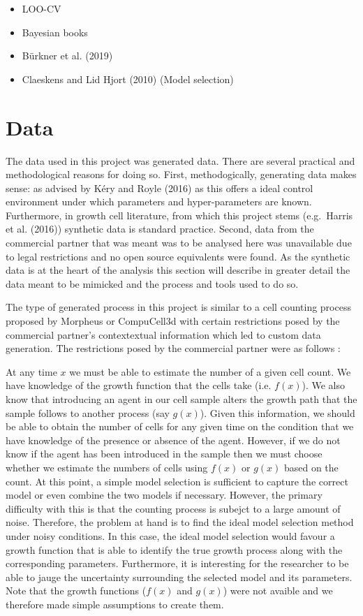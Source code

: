 \documentclass[]{article}
\providecommand{\tightlist}{%
  \setlength{\itemsep}{0pt}\setlength{\parskip}{0pt}}
\begin{document}
\begin{itemize}
\tightlist
\item
  LOO-CV
\item
  Bayesian books
\item
  Bürkner et al. (2019)
\item
  Claeskens and Lid Hjort (2010) (Model selection)
\end{itemize}

\hypertarget{data}{%
\section{Data}\label{data}}

The data used in this project was generated data. There are several
practical and methodological reasons for doing so. First,
methodogically, generating data makes sense: as advised by Kéry and
Royle (2016) as this offers a ideal control environment under which
parameters and hyper-parameters are known. Furthermore, in growth cell
literature, from which this project stems (e.g.~Harris et al. (2016))
synthetic data is standard practice. Second, data from the commercial
partner that was meant was to be analysed here was unavailable due to
legal restrictions and no open source equivalents were found. As the
synthetic data is at the heart of the analysis this section will
describe in greater detail the data meant to be mimicked and the process
and tools used to do so.

The type of generated process in this project is similar to a cell
counting process proposed by Morpheus or CompuCell3d with certain
restrictions posed by the commercial partner's contextextual information
which led to custom data generation. The restrictions posed by the
commercial partner were as follows :

At any time \(x\) we must be able to estimate the number of a given cell
count. We have knowledge of the growth function that the cells take
(i.e. \(f(x)\)). We also know that introducing an agent in our cell
sample alters the growth path that the sample follows to another process
(say \(g(x)\)). Given this information, we should be able to obtain the
number of cells for any given time on the condition that we have
knowledge of the presence or absence of the agent. However, if we do not
know if the agent has been introduced in the sample then we must choose
whether we estimate the numbers of cells using \(f(x)\) or \(g(x)\)
based on the count. At this point, a simple model selection is
sufficient to capture the correct model or even combine the two models
if necessary. However, the primary difficulty with this is that the
counting process is subejct to a large amount of noise. Therefore, the
problem at hand is to find the ideal model selection method under noisy
conditions. In this case, the ideal model selection would favour a
growth function that is able to identify the true growth process along
with the corresponding parameters. Furthermore, it is interesting for
the researcher to be able to jauge the uncertainty surrounding the
selected model and its parameters. Note that the growth functions
(\(f(x)\) and \(g(x)\)) were not avaible and we therefore made simple
assumptions to create them.
\end{document}
